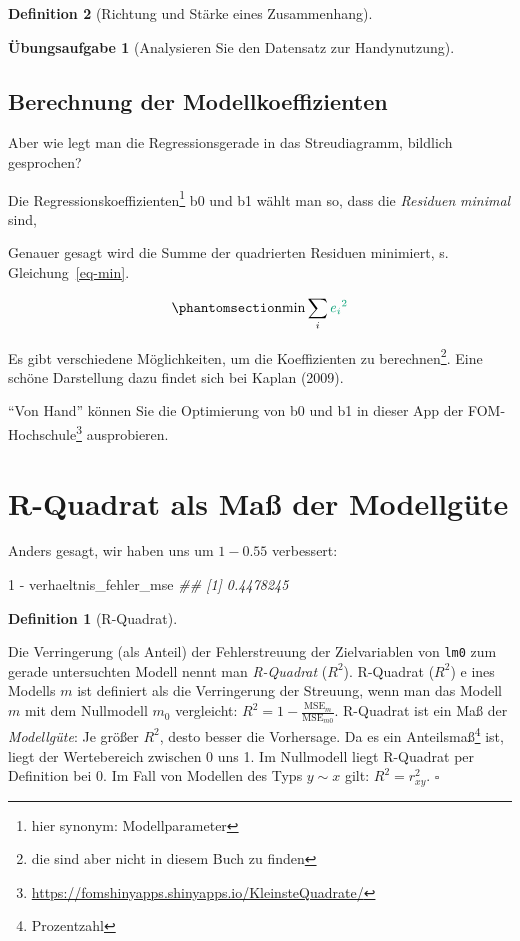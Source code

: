 \documentclass[
  a4paper,
  DIV=11]{scrreprt}
\newenvironment{Shaded}{\begin{snugshade}}{\end{snugshade}}
\newcommand{\DecValTok}[1]{\textcolor[rgb]{0.68,0.00,0.00}{#1}}
\newcommand{\DocumentationTok}[1]{\textcolor[rgb]{0.37,0.37,0.37}{\textit{#1}}}
\newcommand{\NormalTok}[1]{\textcolor[rgb]{0.00,0.23,0.31}{#1}}
\newcommand{\SpecialCharTok}[1]{\textcolor[rgb]{0.37,0.37,0.37}{#1}}
\theoremstyle{definition}
\newtheorem{exercise}{Übungsaufgabe}[chapter]
\theoremstyle{definition}
\theoremstyle{definition}
\newtheorem{definition}{Definition}[chapter]
\theoremstyle{remark}
\begin{document}
\begin{definition}[Richtung und Stärke eines
Zusammenhang]
\begin{exercise}[Analysieren Sie den Datensatz zur
Handynutzung]
\subsection{Berechnung der
Modellkoeffizienten}\label{berechnung-der-modellkoeffizienten}

Aber wie legt man die Regressionsgerade in das Streudiagramm, bildlich
gesprochen?

Die Regressionskoeffizienten\footnote{hier synonym: Modellparameter} b0
und b1 wählt man so, dass die \emph{Residuen} \emph{minimal} sind,

Genauer gesagt wird die Summe der quadrierten {Residuen} minimiert, s.
Gleichung~\ref{eq-min}.

\begin{equation}\phantomsection\label{eq-min}{\text{min}\sum_i \color{errorcol}{e_i}^2}\end{equation}

Es gibt verschiedene Möglichkeiten, um die Koeffizienten zu
berechnen\footnote{die sind aber nicht in diesem Buch zu finden}. Eine
schöne Darstellung dazu findet sich bei Kaplan (2009).

``Von Hand'' können Sie die Optimierung von b0 und b1 in dieser App der
FOM-Hochschule\footnote{\url{https://fomshinyapps.shinyapps.io/KleinsteQuadrate/}}
ausprobieren.

\section{R-Quadrat als Maß der
Modellgüte}\label{r-quadrat-als-mauxdf-der-modellguxfcte}

Anders gesagt, wir haben uns um \(1 - 0.55\) verbessert:

\begin{Shaded}
\begin{Highlighting}[]
\DecValTok{1} \SpecialCharTok{{-}}\NormalTok{ verhaeltnis\_fehler\_mse}
\DocumentationTok{\#\# [1] 0.4478245}
\end{Highlighting}
\end{Shaded}

\begin{definition}[R-Quadrat]\protect\hypertarget{def-r2}{}\label{def-r2}

Die Verringerung (als Anteil) der Fehlerstreuung der Zielvariablen von
\texttt{lm0} zum gerade untersuchten Modell nennt man \emph{R-Quadrat}
(\(R^2\)). R-Quadrat (\(R^2\)) e ines Modells \(m\) ist definiert als
die Verringerung der Streuung, wenn man das Modell \(m\) mit dem
Nullmodell \(m_0\) vergleicht:
\(R^2 =1-  \frac{\text{MSE}_{m}}{\text{MSE}_{m0}}\). R-Quadrat ist ein
Maß der \emph{Modellgüte}: Je größer \(R^2\), desto besser die
Vorhersage. Da es ein Anteilsmaß\footnote{Prozentzahl} ist, liegt der
Wertebereich zwischen 0 uns 1. Im Nullmodell liegt R-Quadrat per
Definition bei 0. Im Fall von Modellen des Typs \(y\sim x\) gilt:
\(R^2 = r_{xy}^2\). \(\square\)


\end{definition}
\end{exercise}
\end{definition}
\end{document}
